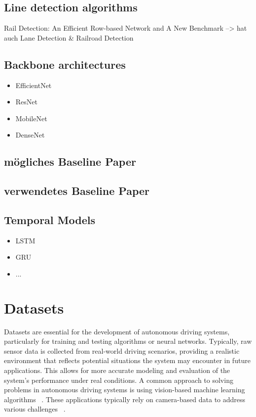 \subsection{Line detection algorithms}
Rail Detection: An Efficient Row-based Network and A New Benchmark --> hat auch Lane Detection \& Railroad Detection
\subsection{Backbone architectures}

\begin{itemize}
    \item EfficientNet
    \item ResNet
    \item MobileNet
    \item DenseNet
\end{itemize}

\subsection{mögliches Baseline Paper}
\subsection{verwendetes Baseline Paper}
\subsection{Temporal Models}

\begin{itemize}
    \item LSTM
    \item GRU
    \item ...
\end{itemize}

\clearpage
\section{Datasets}

Datasets are essential for the development of autonomous driving systems, particularly for training and testing algorithms or neural networks.
Typically, raw sensor data is collected from real-world driving scenarios, providing a realistic environment that reflects potential situations the system may encounter in future applications.
This allows for more accurate modeling and evaluation of the system's performance under real conditions.
A common approach to solving problems in autonomous driving systems is using vision-based machine learning algorithms ~\cite[S.~1221]{railsem19dataset}.
These applications typically rely on camera-based data to address various challenges ~\cite[S.~1221]{railsem19dataset}.

